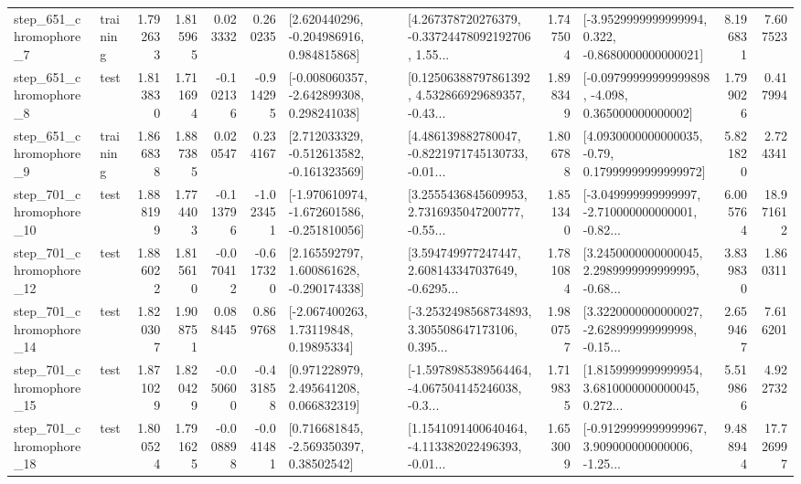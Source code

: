 \begin{tabular}{llrrrrllrlrr}
   step\_651\_chromophore\_7 &  training &      1.792633 &    1.815965 &      0.023332 &  0.260235 &    [2.620440296, -0.204986916, 0.984815868] &  [4.267378720276379, -0.33724478092192706, 1.55... &       1.747504 &  [-3.9529999999999994, 0.322, -0.8680000000000021] &            8.196831 &          7.607523 \\
   step\_651\_chromophore\_8 &      test &      1.813830 &    1.711694 &     -0.102136 & -0.914295 &   [-0.008060357, -2.642899308, 0.298241038] &  [0.12506388797861392, 4.532866929689357, -0.43... &       1.898349 &  [-0.09799999999999898, -4.098, 0.365000000000002] &            1.799026 &          0.417994 \\
   step\_651\_chromophore\_9 &  training &      1.866838 &    1.887385 &      0.020547 &  0.234167 &   [2.712033329, -0.512613582, -0.161323569] &  [4.486139882780047, -0.8221971745130733, -0.01... &       1.806788 &   [4.0930000000000035, -0.79, 0.17999999999999972] &            5.821820 &          2.724341 \\
  step\_701\_chromophore\_10 &      test &      1.888199 &    1.774403 &     -0.113796 & -1.023451 &  [-1.970610974, -1.672601586, -0.251810056] &  [3.2555436845609953, 2.7316935047200777, -0.55... &       1.851340 &  [-3.049999999999997, -2.710000000000001, -0.82... &            6.005764 &         18.971612 \\
  step\_701\_chromophore\_12 &      test &      1.886022 &    1.815610 &     -0.070412 & -0.617320 &    [2.165592797, 1.600861628, -0.290174338] &  [3.594749977247447, 2.608143347037649, -0.6295... &       1.781084 &  [3.2450000000000045, 2.2989999999999995, -0.68... &            3.839830 &          1.860311 \\
  step\_701\_chromophore\_14 &      test &      1.820307 &    1.908751 &      0.088445 &  0.869768 &      [-2.067400263, 1.73119848, 0.19895334] &  [-3.2532498568734893, 3.305508647173106, 0.395... &       1.980757 &  [3.3220000000000027, -2.628999999999998, -0.15... &            2.659467 &          7.616201 \\
  step\_701\_chromophore\_15 &      test &      1.871029 &    1.820429 &     -0.050600 & -0.431858 &     [0.971228979, 2.495641208, 0.066832319] &  [-1.5978985389564464, -4.067504145246038, -0.3... &       1.719835 &  [1.8159999999999954, 3.6810000000000045, 0.272... &            5.519866 &          4.922732 \\
  step\_701\_chromophore\_18 &      test &      1.800524 &    1.791625 &     -0.008898 & -0.041481 &     [0.716681845, -2.569350397, 0.38502542] &  [1.1541091400640464, -4.113382022496393, -0.01... &       1.653009 &  [-0.9129999999999967, 3.909000000000006, -1.25... &            9.488944 &         17.726997 \\

\end{tabular}

